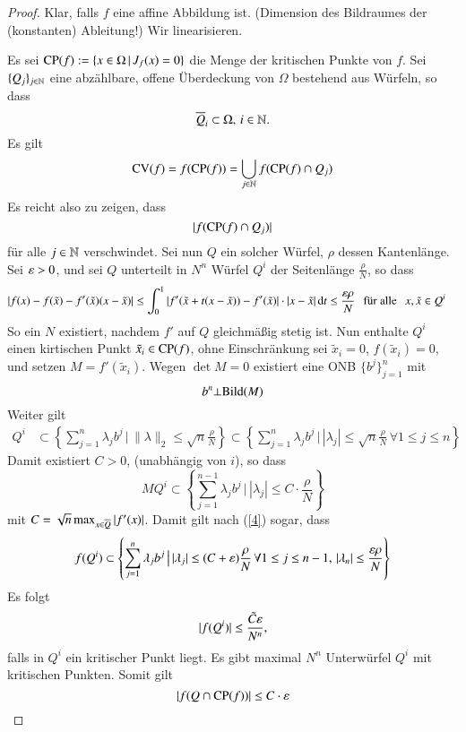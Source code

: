 \begin{proof}
    Klar, falls $f$ eine affine Abbildung ist. (Dimension des Bildraumes der (konstanten) Ableitung!)
    Wir linearisieren. 

    \noindent Es sei $\mathrm{CP}(f):=\{x\in \Omega\,|\, J_f(x)=0\}$ die Menge der kritischen Punkte von $f$.
    Sei $\{ Q_j \}_{j\in \mathbb{N}}$ eine abzählbare, offene Überdeckung von $\Omega$ bestehend aus Würfeln,
    so dass
    \[
        \overline Q_i\subset \Omega, \, i\in \mathbb{N}.
    \]
    Es gilt 
    \[
        \mathrm{CV}(f)=f(\mathrm{CP}(f))=\bigcup_{j\in \mathbb{N}} f(\mathrm{CP}(f)\cap Q_j)
    \]
    Es reicht also zu zeigen, dass
    \[
    |f(\mathrm{CP}(f)\cap Q_j)|
    \]
    für alle $j\in \mathbb{N}$ verschwindet. Sei nun $Q$ ein solcher Würfel, $\rho$ dessen Kantenlänge.
    Sei $\varepsilon >0$, und sei $Q$ unterteilt in $N^n$ Würfel $Q^i$ der Seitenlänge $\frac{\rho}{N}$, so
    dass
    \begin{align}\label{4}
        |f(x)-f(\tilde x)-f'(\tilde x)(x-\tilde x)|&\leq \int_0^1|f'(\tilde x+t(x-\tilde x))-
        f'(\tilde x)|\cdot|x-\tilde x|\, \mathrm{d} t\leq \frac{\varepsilon\rho}{N} \hspace{.25cm} \text{für alle} 
            \hspace{.25cm} x,\tilde x \in Q^i
    \end{align}
    So ein $N$ existiert, nachdem $f'$ auf $Q$ gleichmäßig stetig ist. Nun enthalte $Q^i$ einen
    kirtischen Punkt $\tilde x_i \in \mathrm{CP}(f)$, ohne Einschränkung sei $\tilde x_i=0$, $f(\tilde x_i)=0$,
    und setzen $M=f'(\tilde x _i)$. Wegen $\det M =0$ existiert eine ONB $\{b^j\}_{j=1}^n$ mit
    \[
    b^n \bot \mathrm{Bild}(M)
    \]
    Weiter gilt 
    \begin{align*}
        Q^i&\subset \left\{ \sum_{j=1}^n \lambda _j b^j \, \big| \, \| \lambda \|_2\leq \sqrt{n} 
            \frac{\rho}{N} \right\}\subset\left\{\sum_{j=1}^n\lambda _jb^j \, \big|
            \, |\lambda_j|\leq \sqrt{n}\frac{\rho}{N} \, \forall 1\leq j\leq n\right\}
    \end{align*}
    Damit existiert $C>0$, (unabhängig von $i$), so dass
    \[
        MQ^i\subset \left\{\sum_{j=1}^{n-1}\lambda_jb^j\, \big| \, |\lambda_j|
            \leq C\cdot \frac{\rho}{N} \right\}
    \]
    mit $C=\sqrt{n} \max_{x\in \overline Q}|f'(x)| $. Damit gilt nach (\ref{4}) sogar, dass
    \[
        f(Q^i)\subset\left\{ \sum_{j=1}^n \lambda_jb^j\, \big| \, |\lambda_j|\leq 
        (C+\varepsilon)\frac{\rho}{N} \, \forall 1\leq j\leq n-1, \, |\lambda_n|\leq \frac{\varepsilon\rho}{N}\right\}
    \]
    Es folgt
    \[
        |f(Q^i)|\leq \frac{\tilde C\varepsilon}{N^n},
    \]
    falls in $Q^i$ ein kritischer Punkt liegt. Es gibt maximal $N^n$ Unterwürfel $Q^i$ mit kritischen
    Punkten. Somit gilt
    \[
        |f(Q\cap \mathrm{CP}(f))|\leq C\cdot \varepsilon
    \]
\end{proof}

